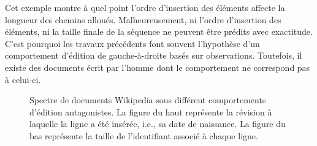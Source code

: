 Cet exemple montre à quel point l'ordre d'insertion des éléments affecte la
longueur des chemins alloués. Malheureusement, ni l'ordre d'insertion des
éléments, ni la taille finale de la séquence ne peuvent être prédits avec
exactitude. C'est pourquoi les travaux précédents font souvent l'hypothèse d'un
comportement d'édition de gauche-à-droite basés sur observations. Toutefois, il
existe des documents écrit par l'homme dont le comportement ne correspond pas à
celui-ci.

\begin{figure}
  \centering
  \hspace{10pt}
  \caption{\label{fig:lseq:allocation}Spectre de documents Wikipedia sous différent
    comportements d'édition antagonistes. La figure du haut représente la
    révision à laquelle la ligne a été insérée, i.e., sa date de naissance.  La
    figure du bas représente la taille de l'identifiant associé à chaque ligne.}
\end{figure}

